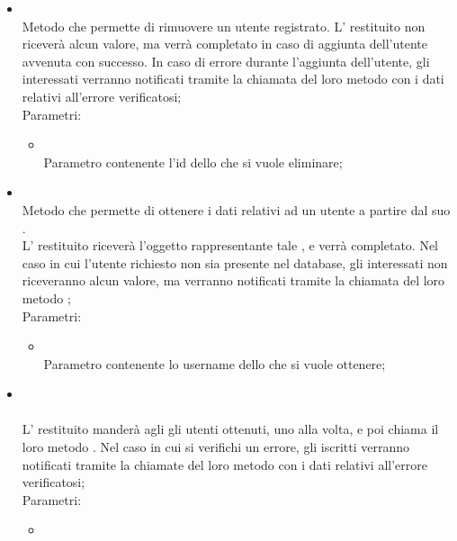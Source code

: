 \begin{itemize}
\begin{itemize}
\begin{itemize}
		\end{itemize}
		\item[]  \\		Metodo che permette di rimuovere un utente registrato. L' restituito non riceverà alcun valore, ma verrà completato in caso di aggiunta dell'utente avvenuta con successo. In caso di errore durante l'aggiunta dell'utente, gli  interessati verranno notificati tramite la chiamata del loro metodo  con i dati relativi all'errore verificatosi;\\
		Parametri:
		\begin{itemize}
			\item {} \\
			Parametro contenente l'id dello  che si vuole eliminare;
		\end{itemize}
		\item[]  \\		Metodo che permette di ottenere i dati relativi ad un utente a partire dal suo . \\
L' restituito riceverà l'oggetto rappresentante tale , e verrà completato. Nel caso in cui l'utente richiesto non sia presente nel database, gli  interessati non riceveranno alcun valore, ma verranno notificati tramite la chiamata del loro metodo ;\\
		Parametri:
		\begin{itemize}
			\item {} \\
			Parametro contenente lo username dello  che si vuole ottenere;
		\end{itemize}
		\item[]  \\\\		L' restituito manderà agli  gli utenti ottenuti, uno alla volta, e poi chiama il loro metodo . Nel caso in cui si verifichi un errore, gli  iscritti verranno notificati tramite la chiamate del loro metodo  con i dati relativi all'errore verificatosi;\\
		Parametri:
		\begin{itemize}
			\item {} \\

\end{itemize}
\end{itemize}
\end{itemize}
